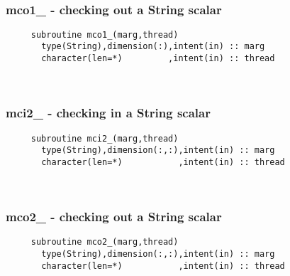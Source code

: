  
\mbox{}\hrulefill\ 

  \subsubsection{mco1\_ - checking out a String scalar}

\begin{verbatim} 
     subroutine mco1_(marg,thread)
       type(String),dimension(:),intent(in) :: marg
       character(len=*)         ,intent(in) :: thread
 \end{verbatim}%
 
 
\mbox{}\hrulefill\ 
 
  \subsubsection{mci2\_ - checking in a String scalar}

\begin{verbatim} 
     subroutine mci2_(marg,thread)
       type(String),dimension(:,:),intent(in) :: marg
       character(len=*)           ,intent(in) :: thread
 \end{verbatim}%
 
 
\mbox{}\hrulefill\ 
 
  \subsubsection{mco2\_ - checking out a String scalar}

\begin{verbatim} 
     subroutine mco2_(marg,thread)
       type(String),dimension(:,:),intent(in) :: marg
       character(len=*)           ,intent(in) :: thread
 \end{verbatim}%
 
